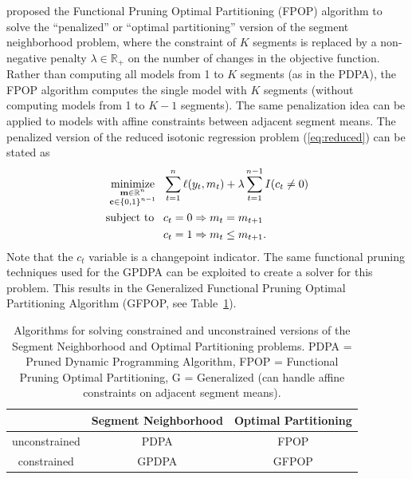 \documentclass{article}
\DeclareMathOperator*{\minimize}{minimize}
\newcommand{\RR}{\mathbb R}
\begin{document}
\citet{fpop} proposed the Functional Pruning Optimal Partitioning
(FPOP) algorithm to solve the ``penalized'' or ``optimal
partitioning'' version of the segment neighborhood problem, where the
constraint of $K$ segments is replaced by a non-negative penalty
$\lambda\in\RR_+$ on the number of changes in the objective
function. Rather than computing all models from 1 to $K$ segments (as
in the PDPA), the FPOP algorithm computes the single model with $K$
segments (without computing models from 1 to $K-1$ segments). The same
penalization idea can be applied to models with affine constraints
between adjacent segment means.  The penalized version of the reduced
isotonic regression problem (\ref{eq:reduced}) can be stated as
\begin{align}
  \label{eq:penalized_reduced_isotonic}
  \minimize_{
    \substack{
    \mathbf m\in\RR^n\\
\mathbf c\in\{0,1\}^{n-1}
}
    } &\ \ 
  \sum_{t=1}^n \ell(y_t, m_t) + \lambda \sum_{t=1}^{n-1} I(c_t \neq 0) \\
  \text{subject to\,} &\ \ c_t = 0 \Rightarrow m_t = m_{t+1}
  \nonumber\\
&\ \ c_t = 1 \Rightarrow m_t \leq m_{t+1}.
\nonumber
\nonumber
\end{align}
Note that the $c_t$ variable is a changepoint indicator.  The same
functional pruning techniques used for the GPDPA can be exploited to
create a solver for this problem. This results in the Generalized
Functional Pruning Optimal Partitioning Algorithm (GFPOP, see
Table~\ref{tab:GFPOP}).

\begin{table}
  \centering
\begin{tabular}{c|c|c}
  & Segment Neighborhood & Optimal Partitioning\\
\hline
unconstrained & PDPA & FPOP \\
\hline
constrained & GPDPA & GFPOP 
\end{tabular}
\caption{
Algorithms for solving constrained and unconstrained versions 
of the Segment Neighborhood and Optimal Partitioning problems. 
PDPA = Pruned Dynamic Programming Algorithm, 
FPOP = Functional Pruning Optimal Partitioning, 
G = Generalized (can handle affine constraints on adjacent segment means).}
\label{tab:GFPOP}
\end{table}
\end{document}
